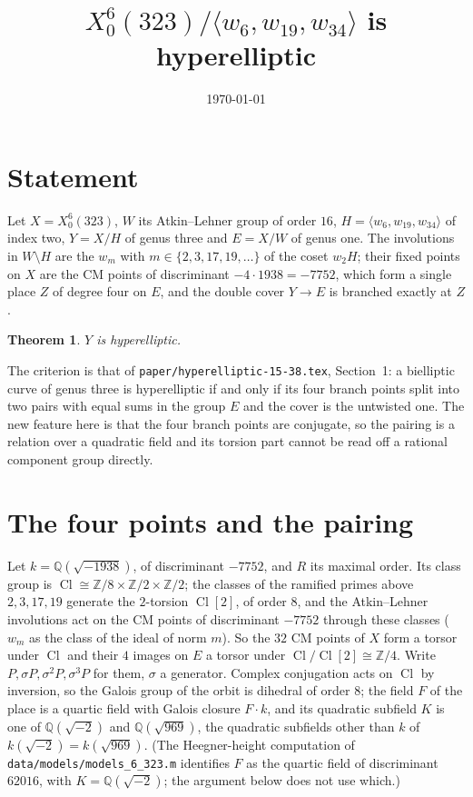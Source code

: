 \documentclass[11pt,reqno]{amsart}
\theoremstyle{plain}
\newtheorem{theorem}{Theorem}[section]
\theoremstyle{definition}
\DeclareMathOperator{\Cl}{Cl}
\newcommand{\Q}{\mathbb{Q}}
\newcommand{\Z}{\mathbb{Z}}
\begin{document}
\title{$X_0^{6}(323)/\langle w_6,w_{19},w_{34}\rangle$ is hyperelliptic}
\author{}
\date{\today}
\maketitle

\section{Statement}

Let $X=X_0^6(323)$, $W$ its Atkin--Lehner group of order $16$, $H=\langle w_6,w_{19},w_{34}\rangle$ of index
two, $Y=X/H$ of genus three and $E=X/W$ of genus one. The involutions in $W\setminus H$ are the $w_m$ with
$m\in\{2,3,17,19,\dots\}$ of the coset $w_2H$; their fixed points on $X$ are the CM points of discriminant
$-4\cdot1938=-7752$, which form a single place $Z$ of degree four on $E$, and the double cover $Y\to E$ is
branched exactly at $Z$.

\begin{theorem}\label{thm:main}
$Y$ is hyperelliptic.
\end{theorem}

The criterion is that of \texttt{paper/hyperelliptic-15-38.tex}, Section~1: a bielliptic curve of genus three
is hyperelliptic if and only if its four branch points split into two pairs with equal sums in the group $E$
and the cover is the untwisted one. The new feature here is that the four branch points are conjugate, so the
pairing is a relation over a quadratic field and its torsion part cannot be read off a rational component group
directly.

\section{The four points and the pairing}

Let $k=\Q(\sqrt{-1938})$, of discriminant $-7752$, and $R$ its maximal order. Its class group is
$\Cl\cong\Z/8\times\Z/2\times\Z/2$; the classes of the ramified primes above $2,3,17,19$ generate the
$2$-torsion $\Cl[2]$, of order $8$, and the Atkin--Lehner involutions act on the CM points of discriminant
$-7752$ through these classes ($w_m$ as the class of the ideal of norm $m$). So the $32$ CM points of $X$
form a torsor under $\Cl$ and their $4$ images on $E$ a torsor under $\Cl/\Cl[2]\cong\Z/4$. Write
$P,\sigma P,\sigma^2P,\sigma^3P$ for them, $\sigma$ a generator. Complex conjugation acts on $\Cl$ by
inversion, so the Galois group of the orbit is dihedral of order $8$; the field $F$ of the place is a quartic
field with Galois closure $F\cdot k$, and its quadratic subfield $K$ is one of $\Q(\sqrt{-2})$ and
$\Q(\sqrt{969})$, the quadratic subfields other than $k$ of $k(\sqrt{-2})=k(\sqrt{969})$. (The Heegner-height
computation of \texttt{data/models/models\_6\_323.m} identifies $F$ as the quartic field of discriminant
$62016$, with $K=\Q(\sqrt{-2})$; the argument below does not use which.)
\end{document}
